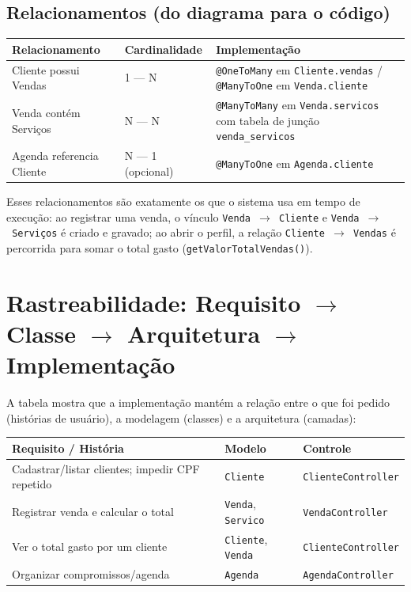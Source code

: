 \documentclass[12pt,a4paper]{article}
\newcommand{\code}[1]{\texttt{#1}}
\begin{document}
\subsection{Relacionamentos (do diagrama para o código)}
\begin{center}
\renewcommand{\arraystretch}{1.3}
\begin{tabularx}{\textwidth}{X l X}
\toprule
\textbf{Relacionamento} & \textbf{Cardinalidade} & \textbf{Implementação} \\
\midrule
Cliente possui Vendas & 1 --- N & \code{@OneToMany} em \code{Cliente.vendas} /
\code{@ManyToOne} em \code{Venda.cliente} \\
Venda contém Serviços & N --- N & \code{@ManyToMany} em \code{Venda.servicos} com
tabela de junção \code{venda\_servicos} \\
Agenda referencia Cliente & N --- 1 (opcional) & \code{@ManyToOne} em
\code{Agenda.cliente} \\
\bottomrule
\end{tabularx}
\end{center}

Esses relacionamentos são exatamente os que o sistema usa em tempo de execução: ao
registrar uma venda, o vínculo \code{Venda~$\rightarrow$~Cliente} e
\code{Venda~$\rightarrow$~Serviços} é criado e gravado; ao abrir o perfil, a relação
\code{Cliente~$\rightarrow$~Vendas} é percorrida para somar o total gasto
(\code{getValorTotalVendas()}).

\section{Rastreabilidade: Requisito $\rightarrow$ Classe $\rightarrow$ Arquitetura $\rightarrow$ Implementação}

A tabela mostra que a implementação mantém a relação entre o que foi pedido
(histórias de usuário), a modelagem (classes) e a arquitetura (camadas):

\begin{center}
\renewcommand{\arraystretch}{1.3}
\begin{tabularx}{\textwidth}{X l l}
\toprule
\textbf{Requisito / História} & \textbf{Modelo} & \textbf{Controle} \\
\midrule
Cadastrar/listar clientes; impedir CPF repetido & \code{Cliente} & \code{ClienteController} \\
Registrar venda e calcular o total & \code{Venda}, \code{Servico} & \code{VendaController} \\
Ver o total gasto por um cliente & \code{Cliente}, \code{Venda} & \code{ClienteController} \\
Organizar compromissos/agenda & \code{Agenda} & \code{AgendaController} \\
\bottomrule
\end{tabularx}
\end{center}
\end{document}
